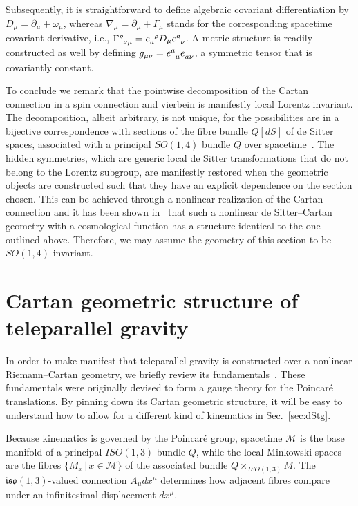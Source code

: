 \documentclass[%
5p,
times,
sort&compress
]{elsarticle}
\newcommand{\ind}{\indices}
\def\mf{\mathfrak}
\def\pd{\partial}
\def\mc{\mathcal}
\begin{document}
Subsequently, it is straightforward to define algebraic covariant 
differentiation by $D_\mu = \pd_\mu + \omega_\mu$, whereas 
$\nabla_\mu = \pd_\mu + \Gamma_\mu$ stands for the corresponding 
spacetime covariant derivative, i.e., $\Gamma\ind{^\rho_{\nu\mu}} 
= e\ind{_a^\rho} D_\mu e\ind{^a_\nu}$. A metric structure is 
readily constructed as well by defining $g_{\mu\nu} 
= e\ind{^a_\mu} e\ind{_{a\nu}}$, a symmetric tensor that is 
covariantly constant.

To conclude we remark that the pointwise decomposition of the 
Cartan connection in a spin connection and vierbein is manifestly 
local Lorentz invariant. The decomposition, albeit arbitrary, is 
not unique, for the possibilities are in a bijective 
correspondence with sections of the fibre bundle $Q[dS]$ of de 
Sitter spaces, associated with a principal $SO(1,4)$ bundle $Q$ 
over spacetime~\cite{husemoller:1966fibre}. The hidden 
symmetries, which are generic local de Sitter transformations 
that do not belong to the Lorentz subgroup, are manifestly 
restored when the geometric objects are constructed such that 
they have an explicit dependence on the section chosen.  This can 
be achieved through a nonlinear realization of the Cartan 
connection and it has been shown in~\cite{Jennen:2014mba} that 
such a nonlinear de Sitter--Cartan geometry with a cosmological 
function has a structure identical to the one outlined above.  
Therefore, we may assume the geometry of this section to be 
$SO(1,4)$ invariant.

\section{Cartan geometric structure of teleparallel gravity}
\label{sec:tg}

In order to make manifest that teleparallel gravity is 
constructed over a nonlinear Riemann--Cartan geometry, we briefly 
review its fundamentals~\cite{aldrovandi:2012tele}. These 
fundamentals were originally devised to form a gauge theory for 
the Poincar\'e translations. By pinning down its Cartan geometric 
structure, it will be easy to understand how to allow for 
a different kind of kinematics in Sec.~\ref{sec:dStg}.

Because kinematics is governed by the Poincar\'e group, spacetime 
$\mc{M}$ is the base manifold of a principal $ISO(1,3)$ bundle 
$Q$, while the local Minkowski spaces are the fibres $\{M_x \,|\, 
x \in \mc{M}\}$ of the associated bundle $Q \times_{ISO(1,3)}M$.  
The $\mf{iso}(1,3)$-valued connection $A_\mu dx^\mu$ determines 
how adjacent fibres compare under an infinitesimal displacement 
$dx^\mu$.
\end{document}
